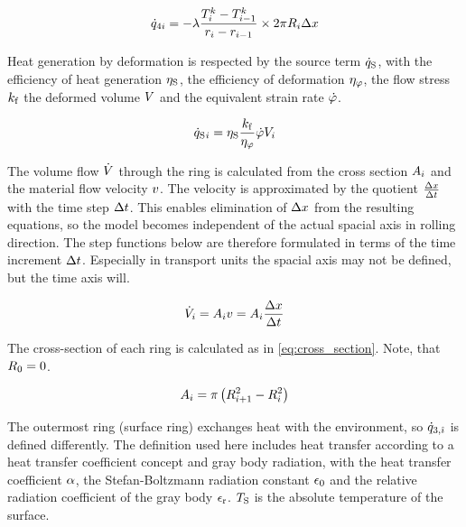 \documentclass{PyRollDocs}
\begin{document}
    \begin{equation}
        {\dot{q}}_{4{i}} = -{\lambda} \frac{{T}_{{i}}^{{k}}-{T}_{{i}-1}^{{k}}}{{r}_{{i}} - {r}_{{i} - 1}} \times 2 \pi {R}_{{i}} {\Delta x}
        \label{eq:heat_flow_4}
    \end{equation}

    Heat generation by deformation is respected by the source term ${\dot{q}_\mathrm{S}}$, with the efficiency of heat generation ${\eta_\mathrm{S}}$, the efficiency of deformation ${\eta_\varphi}$, the flow stress ${k_\mathrm{f}}$ the deformed volume ${V}$ and the equivalent strain rate ${\dot{\varphi}}$.

    \begin{equation}
        {\dot{q}_\mathrm{S}}{}_{i} = {\eta_\mathrm{S}} \frac{{k_\mathrm{f}}}{{\eta_\varphi}} {\dot{\varphi}} {V}_{{i}}
        \label{eq:heat_source}
    \end{equation}

    The volume flow ${\dot{V}}$ through the ring is calculated from the cross section ${A}_{i}$ and the material flow velocity ${v}$.
    The velocity is approximated by the quotient $\frac{{\Delta x}}{{\Delta t}}$ with the time step ${\Delta t}$.
    This enables elimination of ${\Delta x}$ from the resulting equations, so the model becomes independent of the actual spacial axis in rolling direction.
    The step functions below are therefore formulated in terms of the time increment ${\Delta t}$.
    Especially in transport units the spacial axis may not be defined, but the time axis will.

    \begin{equation}
        {\dot{V}}_{i} = {A}_{{i}} {v} = {A}_{{i}} \frac{{\Delta x}}{{\Delta t}}
        \label{eq:volume_flow}
    \end{equation}

    \noindent The cross-section of each ring is calculated as in \autoref{eq:cross_section}.
    Note, that ${R}_0 = 0$.

    \begin{equation}
        {A}_{{i}} = \pi \left( {R}_{{i}+1}^2 -  {R}_{{i}}^2 \right)
        \label{eq:cross_section}
    \end{equation}

    The outermost ring (surface ring) exchanges heat with the environment, so ${\dot{q}}_{3,{\hat{\imath}}}$ is defined differently.
    The definition used here includes heat transfer according to a heat transfer coefficient concept and gray body radiation, with the heat transfer coefficient ${\alpha}$, the Stefan-Boltzmann radiation constant ${\epsilon_0}$ and the relative radiation coefficient of the gray body ${\epsilon_\mathrm{r}}$.
    ${T_\mathrm{S}}$ is the absolute temperature of the surface.
\end{document}
